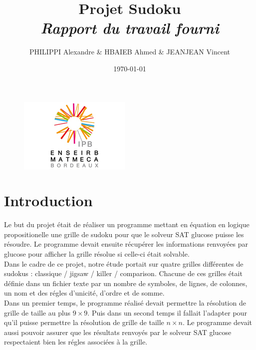 \documentclass[a4paper,8pt,french,fleqn]{article}
\title{\textbf{Projet Sudoku}\\\textit{Rapport du travail fourni}}
\author{PHILIPPI Alexandre \& HBAIEB Ahmed \& JEANJEAN Vincent}
\date{\today}
\begin{document}
\begin{figure}[h]
  \begin{center}
    \includegraphics[scale=1.5]{enseirb.jpg}
    \vspace{2cm}
    \maketitle    
  \end{center}
\end{figure}

\newpage

\tableofcontents

\newpage

\section{Introduction}

Le but du projet était de réaliser un programme mettant en équation en logique propositionelle une grille de sudoku pour que le solveur SAT glucose puisse les résoudre. Le programme devait ensuite récupérer les informations renvoyées par glucose pour afficher la grille résolue si celle-ci était solvable. \\

Dans le cadre de ce projet, notre étude portait sur quatre grilles différentes de sudokus : classique / jigsaw / killer / comparison. Chacune de ces grilles était définie dans un fichier texte par un nombre de symboles, de lignes, de colonnes, un nom et des régles d'unicité, d'ordre et de somme. \\

Dans un premier temps, le programme réalisé devait permettre la résolution de grille de taille au plus $9 \times 9$. Puis dans un second temps il fallait l'adapter pour qu'il puisse permettre la résolution de grille de taille $n \times n$. Le programme devait aussi pouvoir assurer que les résultats renvoyés par le solveur SAT glucose respectaient bien les régles associées à la grille. 

\vspace{0.5cm}
\end{document}
